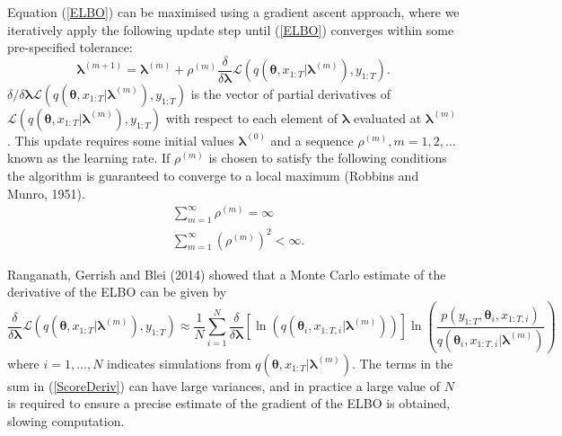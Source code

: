 \documentclass[12pt,a4paper]{article}%
\numberwithin{equation}{section}
\begin{document}
Equation (\ref{ELBO}) can be maximised using a gradient ascent approach, where we iteratively apply the following update step until (\ref{ELBO}) converges within some pre-specified tolerance:
\begin{equation}
\label{GradAscent}
\boldsymbol{\lambda}^{(m+1)} = \boldsymbol{\lambda}^{(m)} + \rho^{(m)} \frac{\delta}{\delta\boldsymbol{\lambda}} \mathcal{L}(q(\boldsymbol{\theta}, x_{1:T} | \boldsymbol{\lambda}^{(m)}), y_{1:T}).
\end{equation}
$\delta/\delta\boldsymbol{\lambda}\mathcal{L}(q(\boldsymbol{\theta}, x_{1:T} | \boldsymbol{\lambda}^{(m)}), y_{1:T})$ is the vector of partial derivatives of $\mathcal{L}(q(\boldsymbol{\theta}, x_{1:T} | \boldsymbol{\lambda}^{(m)}), y_{1:T})$ with respect to each element of $\boldsymbol{\lambda}$ evaluated at $\boldsymbol{\lambda}^{(m)}$. This update requires some initial values $\boldsymbol{\lambda}^{(0)}$ and a sequence $\rho^{(m)}, m = 1, 2, \dots$ known as the learning rate. If $\rho^{(m)}$ is chosen to satisfy the following conditions the algorithm is guaranteed to converge to a local maximum (Robbins and Munro, 1951).
\begin{align}
&\sum_{m=1}^{\infty} \rho^{(m)} =  \infty \\
&\sum_{m=1}^{\infty} (\rho^{(m)})^2 <  \infty.
\end{align}

Ranganath, Gerrish and Blei (2014) showed that a Monte Carlo estimate of the derivative of the ELBO can be given by
\begin{equation}
\label{ScoreDeriv}
\frac{\delta}{\delta\boldsymbol{\lambda}}\mathcal{L}(q(\boldsymbol{\theta}, x_{1:T} | \boldsymbol{\lambda}^{(m)}), y_{1:T}) \approx \frac{1}{N}\sum_{i=1}^{N} \frac{\delta}{\delta\boldsymbol{\lambda}} [\ln(q(\boldsymbol{\theta}_i, x_{1:T, i} | \boldsymbol{\lambda}^{(m)}))] \ln \left(\frac{p(y_{1:T}, \boldsymbol{\theta}_i, x_{1:T, i})}{q(\boldsymbol{\theta}_i, x_{1:T, i} | \boldsymbol{\lambda}^{(m)})} \right) 
\end{equation}
where $i = 1, \dots, N$ indicates simulations from $q(\boldsymbol{\theta}, x_{1:T} | \boldsymbol{\lambda}^{(m)})$. 
The terms in the sum in (\ref{ScoreDeriv}) can have large variances, and in practice a large value of $N$ is required to ensure a precise estimate of the gradient of the ELBO is obtained, slowing computation. 
\end{document}
